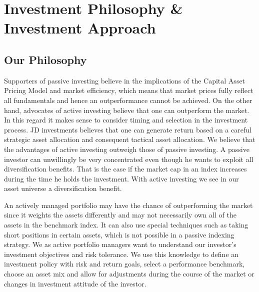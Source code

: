 \documentclass[11pt, parskip=full, DIV=14, headings=small, footsepline, footinclude=false, headsepline]{scrreprt}
\begin{document}

\chapter{Investment Philosophy \& Investment Approach}
\section{Our Philosophy}
Supporters of passive investing believe in the implications of the Capital Asset Pricing Model and market efficiency, which means that market prices fully reflect all fundamentals and hence an outperformance cannot be achieved.
On the other hand, advocates of active investing believe that one can outperform the market.
In this regard it makes sense to consider timing and selection in the investment process.
JD investments believes that one can generate return based on a careful strategic asset allocation and consequent tactical asset allocation.
We believe that the advantages of active investing outweigh those of passive investing.
A passive investor can unwillingly be very concentrated even though he wants to exploit all diversification benefits.
That is the case if the market cap in an index increases during the time he holds the investment.
With active investing we see in our asset universe a diversification benefit.

An actively managed portfolio may have the chance of outperforming the market since it weights the assets differently and may not necessarily own all of the assets in the benchmark index.
It can also use special techniques such as taking short positions in certain assets, which is not possible in a passive indexing strategy.
We as active portfolio managers want to understand our investor’s investment objectives and risk tolerance.
We use this knowledge to define an investment policy with risk and return goals, select a performance benchmark, choose an asset mix and allow for adjustments during the course of the market or changes in investment attitude of the investor.
\end{document}
